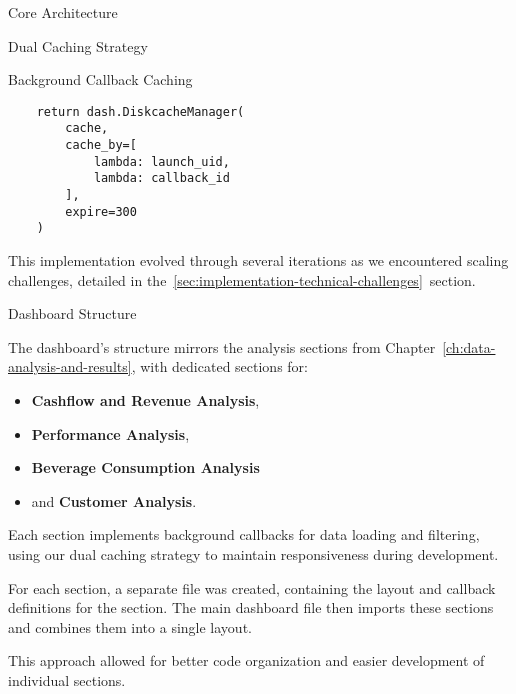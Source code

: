 \begin{section}{Core Architecture}
\begin{subsection}{Dual Caching Strategy}
\begin{subsubsection}{Background Callback Caching}
\begin{listing}[H]
\begin{verbatim}
    return dash.DiskcacheManager(
        cache,
        cache_by=[
            lambda: launch_uid,
            lambda: callback_id
        ],
        expire=300
    )
				\end{verbatim}
				\label{lst:dashboard-implementation-callback-cache}
			\end{listing}

			This implementation evolved through several iterations as we encountered scaling challenges, detailed in the~\autoref{sec:implementation-technical-challenges}~section.
		\end{subsubsection}

		\begin{subsection}{Dashboard Structure}
			\label{subsec:implementation-core-architecture-structure}

			The dashboard's structure mirrors the analysis sections from Chapter~\ref{ch:data-analysis-and-results}, with dedicated sections for:

			\begin{itemize}
				\item \textbf{Cashflow and Revenue Analysis},
				\item \textbf{Performance Analysis},
				\item \textbf{Beverage Consumption Analysis}
				\item and \textbf{Customer Analysis}.
			\end{itemize}

			Each section implements background callbacks for data loading and filtering, using our dual caching strategy to maintain responsiveness during development.

			For each section, a separate file was created, containing the layout and callback definitions for the section.
			The main dashboard file then imports these sections and combines them into a single layout.

			This approach allowed for better code organization and easier development of individual sections.
		\end{subsection}
	\end{subsection}
\end{section}

